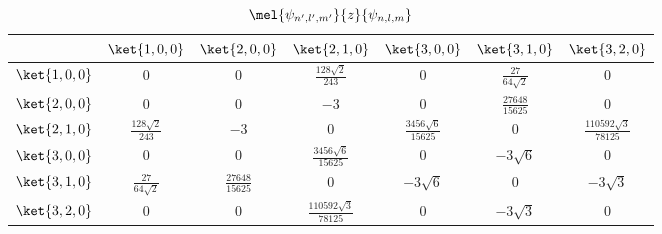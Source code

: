 

\begin{table}[ht]
\centering
\caption{$\mel{\psi_{n',l',m'}}{z}{\psi_{n,l,m}}$}\label{HDipM_tab1}
\begin{tabular}{|c|c|c|c|c|c|c|}
\hline
& $\ket{1,0,0}$ & $\ket{2,0,0}$ & $\ket{2,1,0}$ & $\ket{3,0,0}$ & $\ket{3,1,0}$ & $\ket{3,2,0}$\\
\hline
$\ket{1,0,0}$ & 0 & 0 & $\frac{128\sqrt 2}{243}$ & 0 & $\frac{27}{64\sqrt 2}$ & 0 \\
\hline
$\ket{2,0,0}$ & 0 & 0 & $-3$ & 0 & $\frac{27648}{15625}$ & 0 \\
\hline
$\ket{2,1,0}$ & $\frac{128\sqrt 2}{243}$ & $-3$ & 0 & $\frac{3456\sqrt 6}{15625}$ & 0 & $\frac{110592\sqrt 3}{78125}$ \\
\hline
$\ket{3,0,0}$ & 0 & 0 & $\frac{3456\sqrt 6}{15625}$ & 0 & $-3\sqrt 6$ & 0 \\
\hline
$\ket{3,1,0}$ & $\frac{27}{64\sqrt 2}$ & $\frac{27648}{15625}$ & 0 & $-3\sqrt 6$ & 0 & $-3 \sqrt 3$ \\
\hline
$\ket{3,2,0}$ & 0 & 0 & $\frac{110592\sqrt 3}{78125}$ & 0 & $-3\sqrt 3$ & 0 \\
\hline
\end{tabular}
\end{table}
